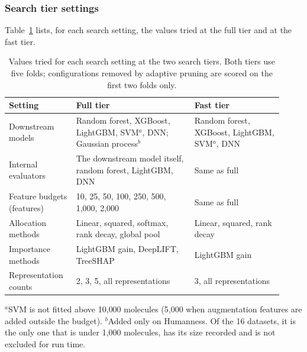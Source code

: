 \subsubsection{Search tier settings}

Table~\ref{tab:search_tiers} lists, for each search setting, the values tried at the full tier and at the fast tier.

\begin{table}[htbp]
\centering
\caption{Values tried for each search setting at the two search tiers. Both tiers use five folds; configurations removed by adaptive pruning are scored on the first two folds only.}
\label{tab:search_tiers}
\begin{tabular}{@{}p{0.22\linewidth}p{0.40\linewidth}p{0.30\linewidth}@{}}
\toprule
Setting & Full tier & Fast tier \\
\midrule
Downstream models & Random forest, XGBoost, LightGBM, SVM$^{a}$, DNN; Gaussian process$^{b}$ & Random forest, XGBoost, LightGBM, SVM$^{a}$, DNN \\
Internal evaluators & The downstream model itself, random forest, LightGBM, DNN & Same as full \\
Feature budgets (features) & 10, 25, 50, 100, 250, 500, 1{,}000, 2{,}000 & Same as full \\
Allocation methods & Linear, squared, softmax, rank decay, global pool & Linear, squared, rank decay \\
Importance methods & LightGBM gain, DeepLIFT, TreeSHAP & LightGBM gain \\
Representation counts & 2, 3, 5, all representations & 3, all representations \\
\bottomrule
\end{tabular}

\smallskip
{\footnotesize $^{a}$SVM is not fitted above 10{,}000 molecules (5{,}000 when augmentation features are added outside the budget). $^{b}$Added only on Humanness. Of the 16 datasets, it is the only one that is under 1{,}000 molecules, has its size recorded and is not excluded for run time.}
\end{table}

